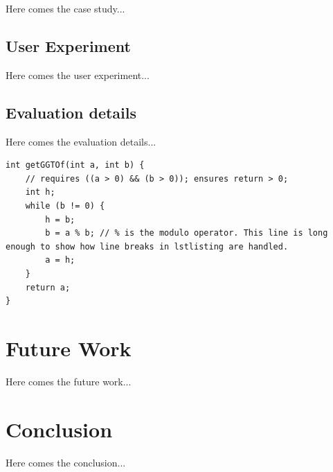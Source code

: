 \documentclass[
    fontsize=12pt,
    headings=small,
    parskip=half,           %
    bibliography=totoc,
    numbers=noenddot,       %
    open=any,               %
    ]{scrreprt}
\begin{document}
Here comes the case study...

\section{User Experiment}

Here comes the user experiment...

\section{Evaluation details}

Here comes the evaluation details...

\begin{lstlisting}[float,caption={Example of algorithm},label={lst:ggt}]
int getGGTOf(int a, int b) {
    // requires ((a > 0) && (b > 0)); ensures return > 0;
    int h;
    while (b != 0) {
        h = b;
        b = a % b; // % is the modulo operator. This line is long enough to show how line breaks in lstlisting are handled.
        a = h;
    }
    return a;
}
\end{lstlisting}


\chapter{Future Work}

Here comes the future work...


\chapter{Conclusion}

Here comes the conclusion...


%
%
\newpage


\end{document}
